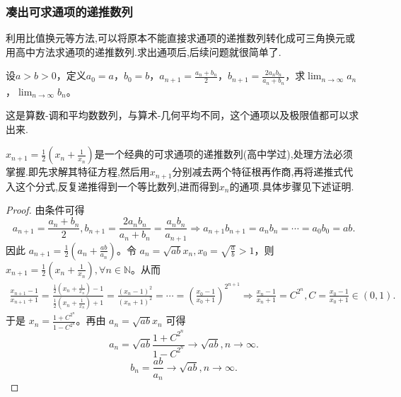 \documentclass[../../main.tex]{subfiles}%
\begin{document}
\subsubsection{凑出可求通项的递推数列}

利用比值换元等方法,可以将原本不能直接求通项的递推数列转化成可三角换元或用高中方法求通项的递推数列.求出通项后,后续问题就很简单了.

\begin{example}
设\(a > b>0\)，定义\(a_0 = a\)，\(b_0 = b\)，\(a_{n + 1}=\frac{a_n + b_n}{2}\)，\(b_{n + 1}=\frac{2a_nb_n}{a_n + b_n}\)，求\(\lim_{n\rightarrow\infty}a_n\)，\(\lim_{n\rightarrow\infty}b_n\)。
\end{example}
\begin{remark}
这是算数-调和平均数数列，与算术-几何平均不同，这个通项以及极限值都可以求出来.
\end{remark}
\begin{note}
\(x_{n + 1}=\frac{1}{2}\left(x_n+\frac{1}{x_n}\right)\)是一个经典的可求通项的递推数列(高中学过),处理方法必须掌握.即先求解其特征方程,然后用$x_{n+1}$分别减去两个特征根再作商,再将递推式代入这个分式,反复递推得到一个等比数列,进而得到$x_n$的通项.具体步骤见下述证明.
\end{note}
\begin{proof}
由条件可得
\[
a_{n + 1}=\frac{a_n + b_n}{2},b_{n + 1}=\frac{2a_nb_n}{a_n + b_n}=\frac{a_nb_n}{a_{n + 1}}\Rightarrow a_{n + 1}b_{n + 1}=a_nb_n=\cdots =a_0b_0 = ab.
\]
因此 \(a_{n + 1}=\frac{1}{2}\left(a_n+\frac{ab}{a_n}\right)\)。令 \(a_n=\sqrt{ab}x_n,x_0=\sqrt{\frac{a}{b}}>1\)，则 \(x_{n + 1}=\frac{1}{2}\left(x_n+\frac{1}{x_n}\right),\forall n\in \mathbb{N}\)。从而
\begin{align*}
\frac{x_{n+1}-1}{x_{n+1}+1}=\frac{\frac{1}{2}\left( x_n+\frac{1}{x_n} \right) -1}{\frac{1}{2}\left( x_n+\frac{1}{x_n} \right) +1}=\frac{(x_n-1)^2}{(x_n+1)^2}=\cdots =\left( \frac{x_0-1}{x_0+1} \right) ^{2^{n+1}}\Rightarrow \frac{x_n-1}{x_n+1}=C^{2^n},C=\frac{x_0-1}{x_0+1}\in (0,1).
\end{align*}
于是 \(x_n=\frac{1 + C^{2^n}}{1 - C^{2^n}}\)。再由 \(a_n=\sqrt{ab}x_n\) 可得
\[
a_n=\sqrt{ab}\frac{1 + C^{2^n}}{1 - C^{2^n}}\rightarrow\sqrt{ab},n\rightarrow\infty.
\]
\[
b_n=\frac{ab}{a_n}\rightarrow\sqrt{ab},n\rightarrow\infty.
\]\end{proof}
\end{document}
